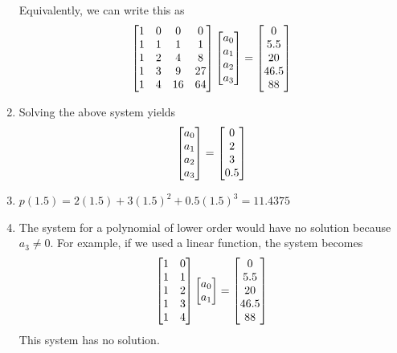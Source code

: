 \documentclass{article}
\begin{document}
\begin{enumerate}
Equivalently, we can write this as
\begin{align*}
\begin{bmatrix}
1 & 0 & 0 & 0 \\
1 & 1 &1 &1\\
1&2&4&8\\ 
1&3&9&27\\ 
1&4&16&64\\ 
 \end{bmatrix}
 \begin{bmatrix} a_0\\a_1\\a_2\\a_3 \end{bmatrix} 
 =  \begin{bmatrix} 0\\5.5\\20\\46.5\\88 \end{bmatrix} 
\end{align*}

\item
Solving the above system yields 
\begin{align*}
 \begin{bmatrix} a_0\\a_1\\a_2\\a_3 \end{bmatrix} 
 =  \begin{bmatrix} 0\\2\\3\\0.5 \end{bmatrix} 
\end{align*}

\item
$p(1.5) = 2(1.5)+3(1.5)^2+0.5(1.5)^3 = 11.4375$


\item
The system for a polynomial of lower order would have no solution because $a_3 \ne 0$. For example, if we used a linear function, the system becomes
\begin{align*}
\begin{bmatrix}
1&0\\
1&1\\
1&2\\ 
1&3\\ 
1&4\\ 
 \end{bmatrix}
 \begin{bmatrix} a_0\\a_1 \end{bmatrix} 
 =  \begin{bmatrix} 0\\5.5\\20\\46.5\\88 \end{bmatrix} 
\end{align*}
This system has no solution. 


\end{enumerate}
\end{document}
